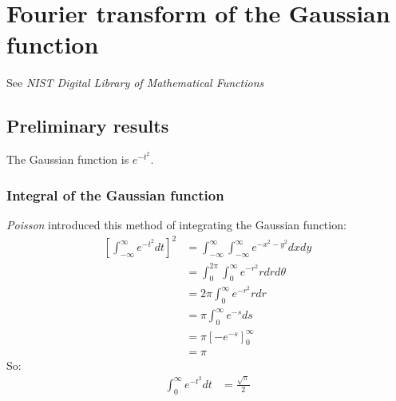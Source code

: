 \documentclass[a4paper,twoside,10pt,english]{report}
\begin{document}
\chapter{\label{app:Fourier-transform-of-the-Gaussian-function}Fourier transform of the Gaussian function}  
See \emph{NIST Digital Library of Mathematical Functions}~\cite[Sections 7.2.1
and 1.14.1]{NIST_DigitalLibraryMathematicalFunctions}
\section{Preliminary results}
The Gaussian function is $e^{-t^2}$.
\subsection{Integral of the Gaussian function}
\emph{Poisson} introduced this method of integrating the Gaussian function:
\begin{align*}
  \left[\int_{-\infty}^{\infty}e^{-t^{2}}dt\right]^{2}
  &=\int_{-\infty}^{\infty}\int_{-\infty}^{\infty}e^{-x^{2}-y^{2}}dxdy\\
  &=\int_{0}^{2\pi}\int_{0}^{\infty}e^{-r^{2}}rdrd\theta\\
  &=2\pi\int_{0}^{\infty}e^{-r^{2}}rdr\\
  &=\pi\int_{0}^{\infty}e^{-s}ds\\
  &=\pi\left[-e^{-s}\right]_{0}^{\infty}\\
  &=\pi
\end{align*}
So:
\begin{align*}
  \int_{0}^{\infty}e^{-t^{2}}dt&=\frac{\sqrt{\pi}}{2}
\end{align*}
\end{document}
